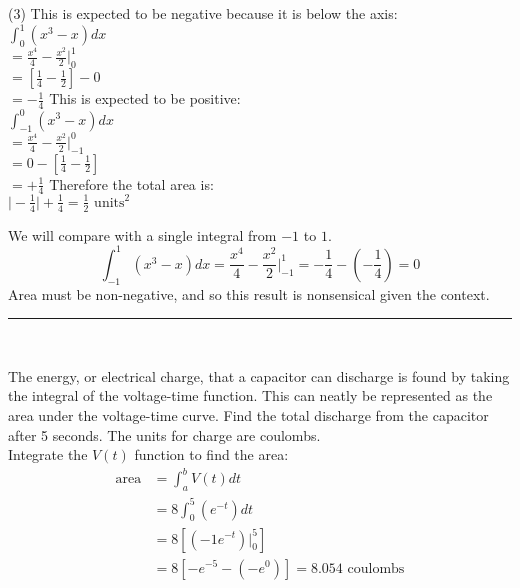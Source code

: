 \begin{tasks}[column-sep=3ex,label-offset=-5em](3)
	\task[]This is expected to be negative because it is below the axis:\\ 
	$\displaystyle\int _{0}^{1}(x^{3} -x) dx$\\
	$\displaystyle=\frac{x^4}{4}-\frac{x^2}{2}\Big\vert_{0}^1$\\
	$\displaystyle=[\frac{1}{4}-\frac{1}{2}]-0$\\
	$\displaystyle=-\frac{1}{4}$
	\task[]This is expected to be positive:\\ 
	$\displaystyle\int _{ -1}^{0}(x^{3} -x) d x$ \\
	$\displaystyle=\frac{x^4}{4}-\frac{x^2}{2}\Big\vert_{-1}^0$\\
	$\displaystyle=0-[\frac{1}{4}-\frac{1}{2}]$\\
	$\displaystyle=+\frac{1}{4}$
	\task[]Therefore the total area is:\medskip\\
	 $\displaystyle\Big\vert-\frac{1}{4}\Big\vert+\frac{1}{4}=\frac{1}{2}\text{ units}^2$
\end{tasks}
We will compare with a single integral from $-1$ to $1$.	
\[\int _{ -1}^{1}(x^{3} -x) d x=\frac{x^4}{4}-\frac{x^2}{2}\vert_{-1}^1 =-\frac{1}{4}-(-\frac{1}{4})=0\]
Area must be non-negative, and so this result is nonsensical given the context.\\  
\rule{6.8cm}{0.5pt}\\
\example 
\begin{multicols}{2}
The energy, or electrical charge, that a capacitor can discharge is found by taking the integral of the voltage-time function. This can neatly be represented as the area under the voltage-time curve. Find the total discharge from the capacitor after 5 seconds. The units for charge are coulombs.\medskip\\
\solution Integrate the $V(t)$ function to find the area:\\
	\begin{align*}
\mathrm{area}&=\int_{a}^{b}V(t)dt\\
&=8\int_{0}^{5}\left(e^{-t}\right)dt\\
&=8\left[\left(-1e^{-t}\right)\Big|_{0}^5\right]\\
&=8\left[-e^{-5}-(-e^{0})\right]=8.054 \,\, \text{coulombs}\\
\end{align*}
\begin{center}
\end{center}
\end{multicols}
